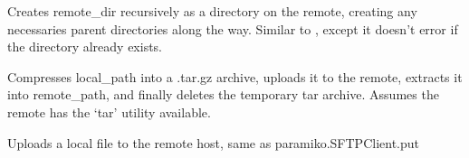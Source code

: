 \documentclass[letterpaper,12pt,english]{sphinxmanual}
\begin{document}
\begin{fulllineitems}
\begin{fulllineitems}
\end{fulllineitems}


\begin{fulllineitems}
\label{\detokenize{PARyOpt.evaluators:PARyOpt.evaluators.connection.Connection.mkdirs}}
\sphinxAtStartPar
Creates remote\_dir recursively as a directory on the remote, creating any necessaries parent directories
along the way. Similar to , except it doesn’t error if the directory already exists.

\end{fulllineitems}


\begin{fulllineitems}
\label{\detokenize{PARyOpt.evaluators:PARyOpt.evaluators.connection.Connection.put_dir}}
\sphinxAtStartPar
Compresses local\_path into a .tar.gz archive, uploads it to the remote, extracts it into remote\_path,
and finally deletes the temporary tar archive. Assumes the remote has the ‘tar’ utility available.

\end{fulllineitems}


\begin{fulllineitems}
\label{\detokenize{PARyOpt.evaluators:PARyOpt.evaluators.connection.Connection.put_file}}
\sphinxAtStartPar
Uploads a local file to the remote host, same as paramiko.SFTPClient.put


\end{fulllineitems}
\end{fulllineitems}
\end{document}
